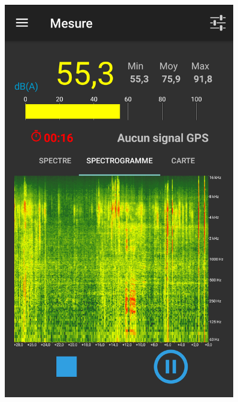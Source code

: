 \begin{figure}
\begin{center}
\begin{minipage}[t]{0.3\textwidth}
        \includegraphics[width=0.9\textwidth]{./figures/autres/noiseCapture3.png}
    \end{minipage}
    \begin{minipage}[t]{0.3\textwidth}
        \centering

\end{minipage}
\end{center}
\end{figure}
